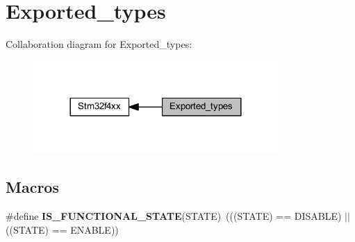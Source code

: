 \hypertarget{group___exported__types}{}\section{Exported\+\_\+types}
\label{group___exported__types}
Collaboration diagram for Exported\+\_\+types\+:\nopagebreak
\begin{figure}[H]
\begin{center}
\leavevmode
\includegraphics[width=264pt]{group___exported__types}
\end{center}
\end{figure}
\subsection*{Macros}
\begin{DoxyCompactItemize}
\item 
\mbox{\label{group___exported__types_gaffaf7c3f537d7a3370b1bbdda67a2bf6}} 
\#define {\bfseries I\+S\+\_\+\+F\+U\+N\+C\+T\+I\+O\+N\+A\+L\+\_\+\+S\+T\+A\+TE}(S\+T\+A\+TE)~(((S\+T\+A\+TE) == D\+I\+S\+A\+B\+LE) $\vert$$\vert$ ((S\+T\+A\+TE) == E\+N\+A\+B\+LE))
\end{DoxyCompactItemize}
